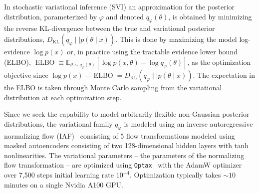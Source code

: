 \documentclass{article}
\newcommand{\SM}[1]{\textcolor{red}{[SM: #1]}}
\theoremstyle{plain}
\theoremstyle{definition}
\theoremstyle{remark}
\begin{document}
In stochastic variational inference (SVI) an approximation for the posterior distribution, parameterized by $\varphi$ and denoted $q_\varphi(\theta)$, is obtained by minimizing the reverse KL-divergence between the true and variational posterior distributions, $D_\mathrm{KL}\left(q_\varphi\mid\mid p(\theta\mid x)\right)$. This is done by maximizing the model log-evidence $\log p(x)$ or, in practice using the tractable evidence lower bound (ELBO), 
$\operatorname{ELBO} \equiv \mathbb E_{\vartheta\sim q_\varphi(\theta)}\left[\log p(x, \theta) - \log q_\varphi(\theta)\right]$,
as the optimization objective since $\log p(x) - \operatorname{ELBO} = D_\mathrm{KL}\left(q_\varphi\mid\mid p(\theta\mid x)\right)$. The expectation in the ELBO is taken through Monte Carlo sampling from the variational distribution at each optimization step.


Since we seek the capability to model arbitrarily flexible non-Gaussian posterior distributions, the variational family $q_\varphi$ is modeled using an inverse autoregressive normalizing flow (IAF)~\cite{10.5555/3157382.3157627} consisting of 5 flow transformations modeled using masked autoencoders consisting of two 128-dimensional hidden layers with tanh nonlinearities.
The variational parameters -- the parameters of the normalizing flow transformation -- are optimized using \texttt{Optax}~\citep{optax2020github} with the AdamW optimizer~\cite{kingma2014adam,loshchilov2017decoupled} over 7,500 steps
initial learning rate $10^{-4}$. Optimization typically takes $\sim 10$ minutes on a single Nvidia A100 GPU.
    
\end{document}
